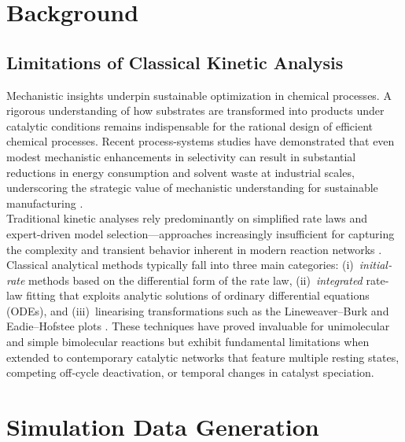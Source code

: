 \documentclass{dissertation}
\begin{document}
\chapter{Background}
\label{chap:background}

\section{Limitations of Classical Kinetic Analysis}

Mechanistic insights underpin sustainable optimization in chemical processes. A rigorous understanding of how substrates are transformed into products under catalytic conditions remains indispensable for the rational design of efficient chemical processes. Recent process-systems studies have demonstrated that even modest mechanistic enhancements in selectivity can result in substantial reductions in energy consumption and solvent waste at industrial scales, underscoring the strategic value of mechanistic understanding for sustainable manufacturing \cite{Baltussen2022}.\\

Traditional kinetic analyses rely predominantly on simplified rate laws and expert-driven model selection---approaches increasingly insufficient for capturing the complexity and transient behavior inherent in modern reaction networks \cite{Stratton2023}. Classical analytical methods typically fall into three main categories: (i)~\emph{initial‐rate} methods based on the differential form of the rate law, (ii)~\emph{integrated} rate‐law fitting that exploits analytic solutions of ordinary differential equations (ODEs), and (iii)~linearising transformations such as the Lineweaver–Burk and Eadie–Hofstee plots \cite{Laidler1987,Espenson2002}. These techniques have proved invaluable for unimolecular and simple bimolecular reactions but exhibit fundamental limitations when extended to contemporary catalytic networks that feature multiple resting states, competing off‑cycle deactivation, or temporal changes in catalyst speciation.



\chapter{Simulation Data Generation}
\label{chap:simulation}
\end{document}
